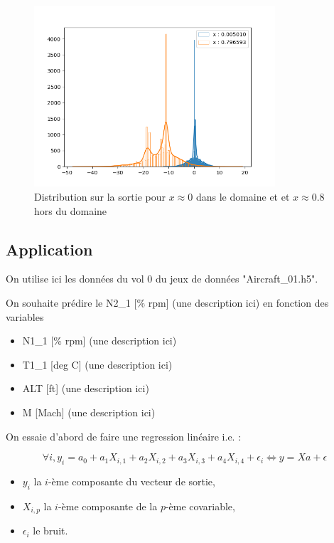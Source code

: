 \documentclass[french,12pt]{article}
\begin{document}
\begin{figure}[H]
    \centering
    \includegraphics[width = 0.8\textwidth]{../plots/plotIncertitudeSortieSin2-12-04-2023_10-48-11--249&329.png}
    \caption{Distribution sur la sortie pour $x \approx 0$ dans le domaine et et $x \approx 0.8$ hors du domaine}
\end{figure}

\subsection{Application}

On utilise ici les données du vol 0 du jeux de données "Aircraft\_01.h5".

On souhaite prédire le N2\_1 [\% rpm] (une description ici) en fonction des variables

\begin{itemize}
    \item N1\_1 [\% rpm] (une description ici)
    \item T1\_1 [deg C] (une description ici)
    \item ALT [ft] (une description ici)
    \item M [Mach] (une description ici)
\end{itemize}

On essaie d'abord de faire une regression linéaire i.e. : 

$$\forall i, y_i = a_0 + a_1 X_{i, 1}+ a_2 X_{i, 2}+ a_3 X_{i, 3}+ a_4 X_{i, 4} + \epsilon_i \Leftrightarrow y = X a + \epsilon$$

\begin{itemize}
    \item $y_i$ la $i$-ème composante du vecteur de sortie,
    \item $X_{i,p}$ la $i$-ème composante de la $p$-ème covariable,
    \item $\epsilon_i$ le bruit.
\end{itemize}
\end{document}
